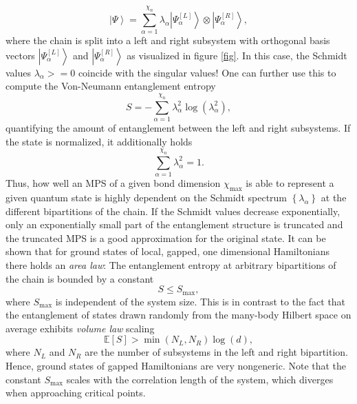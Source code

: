 \begin{equation}
	\left|\Psi\right\rangle = \sum_{\alpha=1}^{\chi_n} \lambda_\alpha \left| \Psi^{[L]}_\alpha\right\rangle \otimes \left|\Psi^{[R]}_\alpha\right\rangle,
\end{equation}
where the chain is split into a left and right subsystem with orthogonal basis vectors $\left|\Psi^{[L]}_\alpha\right\rangle$ and $\left|\Psi^{[R]}_\alpha\right\rangle$ as visualized in figure \ref{fig}. In this case, the Schmidt values $\lambda_\alpha >= 0$ coincide with the singular values! One can further use this to compute the Von-Neumann entanglement entropy
\begin{equation}
	S = -\sum_{\alpha=1}^{\chi_n} \lambda_\alpha^2 \log\left(\lambda_\alpha^2\right),
\end{equation}
quantifying the amount of entanglement between the left and right subsystems. If the state is normalized, it additionally holds
\begin{equation}
	\sum_{\alpha=1}^{\chi_n} \lambda_\alpha^2 = 1.
\end{equation}
Thus, how well an MPS of a given bond dimension $\chi_\text{max}$ is able to represent a given quantum state is highly dependent on the Schmidt spectrum $\left\{\lambda_\alpha\right\}$ at the different bipartitions of the chain. If the Schmidt values decrease exponentially, only an exponentially small part of the entanglement structure is truncated and the truncated MPS is a good approximation for the original state. It can be shown \cite{cite:area_law_1D_proof, cite:area_laws_review} that for ground states of local, gapped, one dimensional Hamiltonians there holds an \textit{area law}: The entanglement entropy at arbitrary bipartitions of the chain is bounded by a constant
\begin{equation}
	S \le S_\text{max}, 
\end{equation}
where $S_\text{max}$ is independent of the system size. This is in contrast to the fact that the entanglement of states drawn randomly from the many-body Hilbert space on average exhibits \textit{volume law} scaling
\begin{equation}
	\mathbb{E}\left[S\right] > \min\left(N_L, N_R\right)\log(d),
\end{equation}
where $N_L$ and $N_R$ are the number of subsystems in the left and right bipartition. Hence, ground states of gapped Hamiltonians are very nongeneric. Note that the constant $S_\text{max}$ scales with the correlation length of the system, which diverges when approaching critical points. \par
